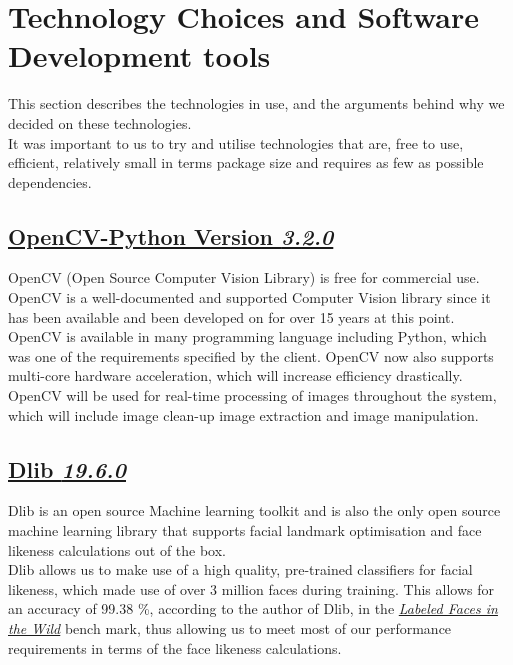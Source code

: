 \documentclass{article}
\begin{document}
		\section{Technology Choices and Software Development tools}
		This section describes the technologies in use, and the
		arguments behind why we decided on these technologies.\\
		It was important to us to try and utilise technologies that are,
		free to use, efficient, relatively small in terms package size and
		requires as few as possible dependencies. 
		\subsection{
		\href{http://docs.opencv.org/3.0-beta/doc/py_tutorials/py_tutorials.html}			{OpenCV-Python Version \textit{3.2.0}}}
		OpenCV (Open Source Computer Vision Library) is free for commercial use.
		OpenCV is a well-documented and supported Computer Vision library
		since it has been available and been developed on for over 15 years at this point.
		OpenCV is available in many programming language 
		including Python, which was one of the requirements specified by the client.
		OpenCV now also supports multi-core hardware acceleration, which will
		increase efficiency drastically. \\

		\noindent
		OpenCV will be used for real-time processing of images throughout the system,
		which will include image clean-up image extraction and image manipulation.

		\subsection{\href{http://dlib.net/}{Dlib \textit{19.6.0}}}
		Dlib is an open source Machine learning toolkit and is also
		the only open source machine learning library that supports facial landmark
		optimisation and face likeness calculations out of the box.\\ 

		\noindent
		Dlib allows us to make use of a high quality, pre-trained classifiers
		for facial likeness, which made use of over 3 million faces 
		during training. This allows for an accuracy of 99.38 \%, according to the author of Dlib, in the
		\href{http://vis-www.cs.umass.edu/lfw/}
		{\textit{Labeled Faces in the Wild}}
		bench mark, thus allowing us to meet most of our performance requirements
		in terms of the face likeness calculations. \\
\end{document}
